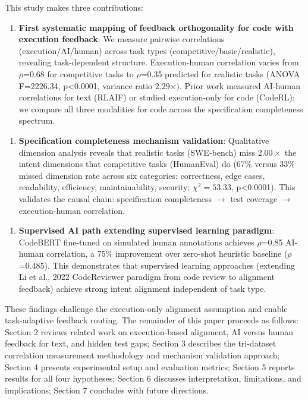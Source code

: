 This study makes three contributions:

\begin{enumerate}
\item \textbf{First systematic mapping of feedback orthogonality for code with execution feedback}: We measure pairwise correlations (execution/AI/human) across task types (competitive/basic/realistic), revealing task-dependent structure. Execution-human correlation varies from $\rho$=0.68 for competitive tasks to $\rho$=0.35 predicted for realistic tasks (ANOVA F=2226.34, p<0.0001, variance ratio 2.$29\times )$. Prior work measured AI-human correlations for text (RLAIF) or studied execution-only for code (CodeRL); we compare all three modalities for code across the specification completeness spectrum.
\end{enumerate}

\begin{enumerate}
\item \textbf{Specification completeness mechanism validation}: Qualitative dimension analysis reveals that realistic tasks (SWE-bench) miss 2.$00\times$ the intent dimensions that competitive tasks (HumanEval) do (67\% versus 33\% missed dimension rate across six categories: correctness, edge cases, readability, efficiency, maintainability, security; $\chi^{2}=53.33$, p<0.0001). This validates the causal chain: specification completeness $\rightarrow$ test coverage $\rightarrow$ execution-human correlation.
\end{enumerate}

\begin{enumerate}
\item \textbf{Supervised AI path extending supervised learning paradigm}: CodeBERT fine-tuned on simulated human annotations achieves $\rho$=0.85 AI-human correlation, a 75\% improvement over zero-shot heuristic baseline ($\rho$=0.485). This demonstrates that supervised learning approaches (extending Li et al., 2022 CodeReviewer paradigm from code review to alignment feedback) achieve strong intent alignment independent of task type.
\end{enumerate}

These findings challenge the execution-only alignment assumption and enable task-adaptive feedback routing. The remainder of this paper proceeds as follows: Section 2 reviews related work on execution-based alignment, AI versus human feedback for text, and hidden test gaps; Section 3 describes the tri-dataset correlation measurement methodology and mechanism validation approach; Section 4 presents experimental setup and evaluation metrics; Section 5 reports results for all four hypotheses; Section 6 discusses interpretation, limitations, and implications; Section 7 concludes with future directions.

